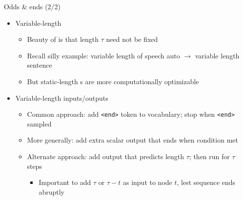 \begin{frame}{Odds \& ends (2/2)}
    \begin{itemize}
        \item<+-> Variable-length \rnn{}
        \begin{itemize}
            \item Beauty of \rnn{} is that length $\tau$ need not be fixed
            \item Recall silly example: variable length of speech auto $\to$ variable length sentence
            \item But static-length \rnn{}s are more computationally optimizable
        \end{itemize}
        \item<+-> Variable-length inputs/outputs
        \begin{itemize}
            \item Common approach: add \texttt{<end>} token to vocabulary; stop \rnn{} when \texttt{<end>} sampled
            \item More generally: add extra scalar output that ends \rnn{} when condition met
            \item Alternate approach: add output that predicts length $\tau$; then run for $\tau$ steps
            \begin{itemize}
                \item Important to add $\tau$ or $\tau - t$ as input to node $t$, lest sequence ends abruptly
            \end{itemize}
        \end{itemize}
    \end{itemize}
\end{frame}

